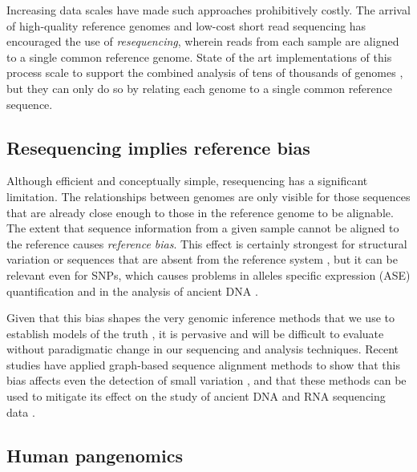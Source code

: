 Increasing data scales have made such approaches prohibitively costly.
The arrival of high-quality reference genomes and low-cost short read sequencing has encouraged the use of \emph{resequencing}, wherein reads from each sample are aligned to a single common reference genome.
State of the art implementations of this process scale to support the combined analysis of tens of thousands of genomes \cite{Poplin_2017}, but they can only do so by relating each genome to a single common reference sequence.

\subsection{Resequencing implies reference bias}

Although efficient and conceptually simple, resequencing has a significant limitation.
The relationships between genomes are only visible for those sequences that are already close enough to those in the reference genome to be alignable.
The extent that sequence information from a given sample cannot be aligned to the reference causes \emph{reference bias}.
This effect is certainly strongest for structural variation or sequences that are absent from the reference system \cite{sudmant2015integrated}, but it can be relevant even for SNPs, which causes problems in alleles specific expression (ASE) quantification \cite{stevenson2013sources} and in the analysis of ancient DNA \cite{zhou2017antcaller}.

Given that this bias shapes the very genomic inference methods that we use to establish models of the truth \cite{zook2014integrating}, it is pervasive and will be difficult to evaluate without paradigmatic change in our sequencing and analysis techniques.
Recent studies have applied graph-based sequence alignment methods to show that this bias affects even the detection of small variation \cite{eggertsson2017graphtyper,Garrison_2018}, and that these methods can be used to mitigate its effect on the study of ancient DNA \cite{martiniano2019removing} and RNA sequencing data \cite{Kim_2019}.

\subsection{Human pangenomics}

